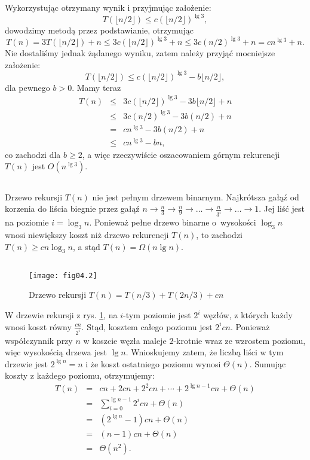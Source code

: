 Wykorzystując otrzymany wynik i przyjmując założenie:
\[
	T(\lfloor n/2\rfloor)\le c(\lfloor n/2\rfloor)^{\lg 3},
\]
dowodzimy metodą przez podstawianie, otrzymując
\[
	T(n) = 3T(\lfloor n/2\rfloor)+n\le 3c(\lfloor n/2\rfloor)^{\lg 3}+n\le 3c(n/2)^{\lg 3}+n = cn^{\lg 3}+n.
\]
Nie dostaliśmy jednak żądanego wyniku, zatem należy przyjąć mocniejsze założenie:
\[
	T(\lfloor n/2\rfloor)\le c(\lfloor n/2\rfloor)^{\lg 3}-b\lfloor n/2\rfloor,
\]
dla pewnego $b>0$. Mamy teraz
\begin{eqnarray*}
	T(n) &\le& 3c(\lfloor n/2\rfloor)^{\lg 3}-3b\lfloor n/2\rfloor+n \\
	&\le& 3c(n/2)^{\lg 3}-3b(n/2)+n \\
	&=& cn^{\lg 3}-3b(n/2)+n \\
	&\le& cn^{\lg 3}-bn,
\end{eqnarray*}
co zachodzi dla $b\ge 2$, a więc rzeczywiście oszacowaniem górnym rekurencji $T(n)$ jest $O\left(n^{\lg 3}\right)$.

\subsection{} %
Drzewo rekursji $T(n)$ nie jest pełnym drzewem binarnym. Najkrótsza gałąź od korzenia do liścia biegnie przez gałąź $n\to\frac{n}{3}\to\frac{n}{9}\to\dots\to\frac{n}{3^i}\to\dots\to 1$. Jej liść jest na poziomie $i=\log_3n$. Ponieważ pełne drzewo binarne o~wysokości $\log_3n$ wnosi niewiększy koszt niż drzewo rekurencji $T(n)$, to zachodzi $T(n)\ge cn\log_3n$, a stąd $T(n)=\Omega(n\lg n)$.

\subsection{} %
\begin{figure}[h]
	\begin{center}
		\texttt{[image: fig04.2]}
	\end{center}
	\caption{Drzewo rekursji $T(n)=T(n/3)+T(2n/3)+cn$} \label{fig:4.2-3}
\end{figure}

W drzewie rekursji z rys. \ref{fig:4.2-3}, na $i$-tym poziomie jest $2^i$ węzłów, z których każdy wnosi koszt równy $\frac{cn}{2^i}$. Stąd, kosztem całego poziomu jest $2^icn$. Ponieważ współczynnik przy $n$ w koszcie węzła maleje $2$-krotnie wraz ze wzrostem poziomu, więc wysokością drzewa jest $\lg n$. Wnioskujemy zatem, że liczbą liści w tym drzewie jest $2^{\lg n}=n$ i że koszt ostatniego poziomu wynosi $\Theta(n)$. Sumując koszty z każdego poziomu, otrzymujemy:
\begin{eqnarray*}
	T(n) &=& cn+2cn+2^2cn+\cdots+2^{\lg n-1}cn+\Theta(n) \\
	&=& \sum_{i=0}^{\lg n-1}2^icn+\Theta(n) \\
	&=& \left(2^{\lg n}-1\right)cn+\Theta(n) \\
	&=& (n-1)cn+\Theta(n) \\
	&=& \Theta(n^2).
\end{eqnarray*}

